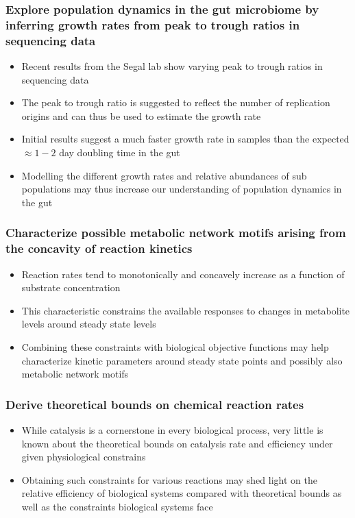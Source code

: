 \documentclass{beamer}
\begin{document}
\begin{frame}
\frametitle{Explore population dynamics in the gut microbiome by inferring growth rates from peak to trough ratios in sequencing data}
\begin{itemize}
\item Recent results from the Segal lab show varying peak to trough ratios in sequencing data
\item The peak to trough ratio is suggested to reflect the number of replication origins and can thus be used to estimate the growth rate
\item Initial results suggest a much faster growth rate in samples than the expected $\approx 1-2$ day doubling time in the gut
\item Modelling the different growth rates and relative abundances of sub populations may thus increase our understanding of population dynamics in the gut
\end{itemize}
\end{frame}
\begin{frame}
\frametitle{Characterize possible metabolic network motifs arising from the concavity of reaction kinetics}
\begin{itemize}
\item Reaction rates tend to monotonically and concavely increase as a function of substrate concentration
\item This characteristic constrains the available responses to changes in metabolite levels around steady state levels
\item Combining these constraints with biological objective functions may help characterize kinetic parameters around steady state points and possibly also metabolic network motifs
\end{itemize}
\end{frame}

\begin{frame}
\frametitle{Derive theoretical bounds on chemical reaction rates}
\begin{itemize}
\item While catalysis is a cornerstone in every  biological process, very little is known about the theoretical bounds on catalysis rate and efficiency under given physiological constrains
\item Obtaining such constraints for various reactions may shed light on the relative efficiency of biological systems compared with theoretical bounds as well as the constraints biological systems face
\end{itemize}
\end{frame}
\end{document}

